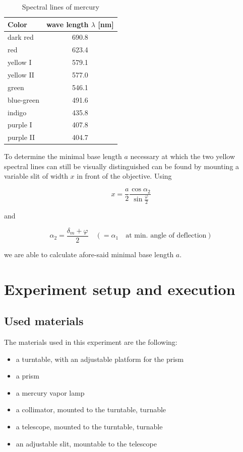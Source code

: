 \documentclass{scrreprt}
\renewcommand{\phi}{\varphi}
\begin{document}
\begin{table}[H]
\centering
\begin{tabular}{|l|c|}
\hline
Color & wave length $\lambda$ [nm]\\
\hline\hline
dark red & 690.8\\
red & 623.4 \\
yellow I & 579.1\\
yellow II & 577.0\\
green & 546.1\\
blue-green & 491.6\\
indigo & 435.8\\
purple I & 407.8\\
purple II & 404.7\\\hline
\end{tabular}
\caption{Spectral lines of mercury}
\label{tab:spectral_lines}
\end{table}

To determine the minimal base length $a$ necessary at which the two yellow spectral lines can still be visually distinguished can be found by mounting a variable slit of width $x$ in front of the objective. Using 

\begin{equation}\label{eq:slit}
x = \frac{a}{2} \frac{\cos{\alpha_2}}{\sin{\frac{\phi}{2}}}
\end{equation}

and

\begin{equation}
\alpha_2 = \frac{\delta_m + \phi}{2} \quad ( = \alpha_1 \quad \text{at min. angle of deflection})
\end{equation}

we are able to calculate afore-said minimal base length $a$. 

\section{Experiment setup and execution}

\subsection{Used materials}
The materials used in this experiment are the following:
\begin{itemize}
\item a turntable, with an adjustable platform for the prism
\item a prism
\item a mercury vapor lamp
\item a collimator, mounted to the turntable, turnable 
\item a telescope, mounted to the turntable, turnable
\item an adjustable slit, mountable to the telescope
\end{itemize}
\end{document}
